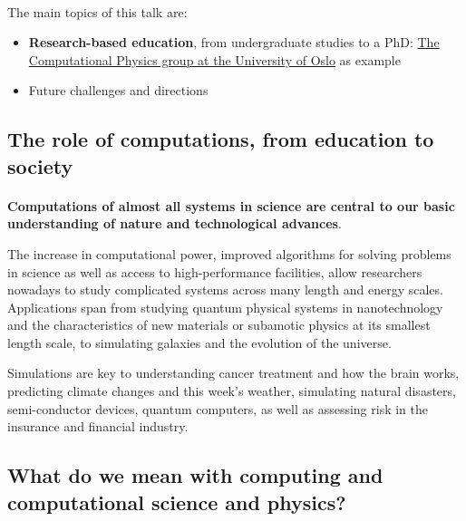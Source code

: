 \documentclass[%
oneside,                 %
final,                   %
10pt]{article}
\begin{document}
\paragraph{}
The main topics of this talk are:

\begin{itemize}
\item \textbf{Research-based education}, from undergraduate studies to a PhD: \href{{http://www.mn.uio.no/fysikk/english/research/groups/computational/index.html}}{The Computational Physics group at the University of Oslo} as example

\item Future challenges and directions
\end{itemize}

\noindent



\subsection{The role of computations, from education to society}

\paragraph{}

\textbf{Computations of almost all systems in science are central to our
basic understanding of nature and technological advances}.

The increase in computational power,
improved algorithms for solving problems in science as well as access
to high-performance facilities, allow researchers nowadays to study
complicated systems across many length and energy scales. Applications
span from studying quantum physical systems in nanotechnology and the
characteristics of new materials or subamotic physics at its smallest
length scale, to simulating galaxies and the evolution of the universe.

Simulations are key to understanding
cancer treatment and how the brain works,
predicting climate changes and this week's weather,
simulating natural disasters, semi-conductor devices,
quantum computers, as well as assessing risk in the insurance and
financial industry.




\subsection{What do we mean with computing and computational science and physics?}
\end{document}
